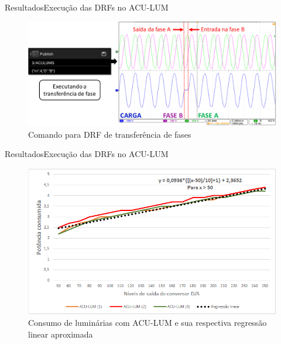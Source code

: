 \begin{frame}{Resultados}{Execução das DRFs no ACU-LUM}
\begin{figure}[htp]
	\centering
	\caption{ \centering\small{{Comando para DRF de transferência de fases}}}
	\includegraphics[width=1\linewidth]{img/apDRF2.png}
    \hspace{5cm}
    \vspace{1cm}
\end{figure}
\end{frame}


\begin{frame}{Resultados}{Execução das DRFs no ACU-LUM}
\vspace{-0.64cm}
\begin{figure}[htp]
	\centering
	\caption{ \centering\small{{Consumo de luminárias com ACU-LUM e sua respectiva regressão linear aproximada}}}
	\includegraphics[width=0.85\linewidth]{img/pot_lum.png}
    \hspace{5cm}
    \vspace{1cm}
\end{figure}
\end{frame}

